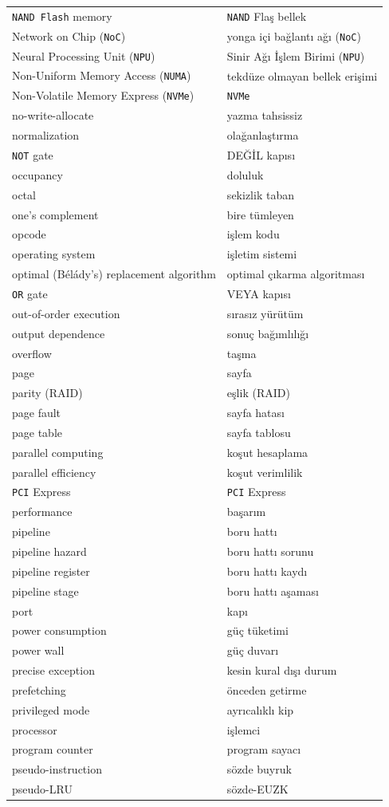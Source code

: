 {\begin{longtable}{@{}p{7.6cm}p{7.6cm}@{}}
\texttt{NAND Flash} memory & \texttt{NAND} Flaş bellek \\
Network on Chip (\texttt{NoC}) & yonga içi bağlantı ağı (\texttt{NoC}) \\
Neural Processing Unit (\texttt{NPU}) & Sinir Ağı İşlem Birimi (\texttt{NPU}) \\
Non-Uniform Memory Access (\texttt{NUMA}) & tekdüze olmayan bellek erişimi \\
Non-Volatile Memory Express (\texttt{NVMe}) & \texttt{NVMe} \\
no-write-allocate & yazma tahsissiz \\
normalization & olağanlaştırma \\
\texttt{NOT} gate & DEĞİL kapısı \\

occupancy & doluluk \\
octal & sekizlik taban \\
one's complement & bire tümleyen \\
opcode & işlem kodu \\
operating system & işletim sistemi \\
optimal (Bélády's) replacement algorithm & optimal çıkarma algoritması \\
\texttt{OR} gate & VEYA kapısı \\
out-of-order execution & sırasız yürütüm \\
output dependence & sonuç bağımlılığı \\
overflow & taşma \\

page & sayfa \\
parity (RAID) & eşlik (RAID) \\
page fault & sayfa hatası \\
page table & sayfa tablosu \\
parallel computing & koşut hesaplama \\
parallel efficiency & koşut verimlilik \\
\texttt{PCI} Express & \texttt{PCI} Express \\
performance & başarım \\
pipeline & boru hattı \\
pipeline hazard & boru hattı sorunu \\
pipeline register & boru hattı kaydı \\
pipeline stage & boru hattı aşaması \\
port & kapı \\
power consumption & güç tüketimi \\
power wall & güç duvarı \\
precise exception & kesin kural dışı durum \\
prefetching & önceden getirme \\
privileged mode & ayrıcalıklı kip \\
processor & işlemci \\
program counter & program sayacı \\
pseudo-instruction & sözde buyruk \\
pseudo-LRU & sözde-EUZK \\


\end{longtable}}
